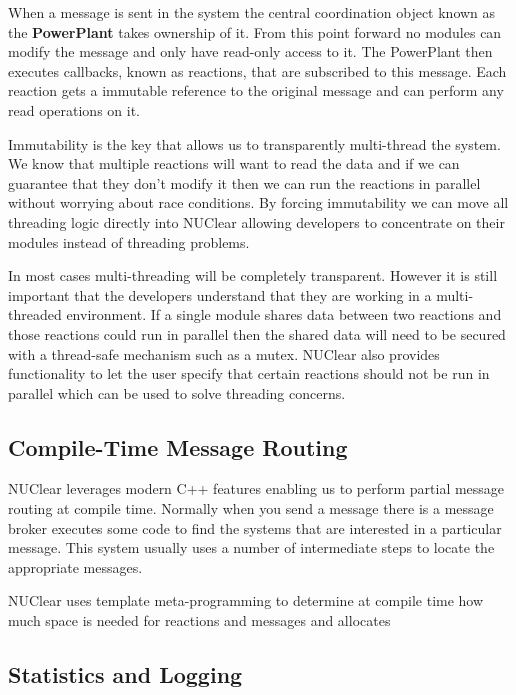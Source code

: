 \documentclass[english,12pt]{scrartcl}
\begin{document}
			When a message is sent in the system the central coordination object known as the \textbf{PowerPlant} takes ownership of it. 
			From this point forward no modules can modify the message and only have read-only access to it.
			The PowerPlant then executes callbacks, known as reactions, that are subscribed to this message.
			Each reaction gets a immutable reference to the original message and can perform any read operations on it.
			
			Immutability is the key that allows us to transparently multi-thread the system.
			We know that multiple reactions will want to read the data and if we can guarantee that they don't modify it then we can
			run the reactions in parallel without worrying about race conditions.
			By forcing immutability we can move all threading logic directly into NUClear allowing developers to concentrate on their modules
			instead of threading problems.
			
			In most cases multi-threading will be completely transparent. 
			However it is still important that the developers understand that they are working in a multi-threaded environment.
			If a single module shares data between two reactions and those reactions could run in parallel then the shared data will
			need to be secured with a thread-safe mechanism such as a mutex.
			NUClear also provides functionality to let the user specify that certain reactions should not be run in parallel which can be used to solve threading concerns.
			
		\subsection{Compile-Time Message Routing}
			NUClear leverages modern C++ features enabling us to perform partial message routing at compile time.
			Normally when you send a message there is a message broker executes some code to find the systems that are interested in a particular message.
			This system usually uses a number of intermediate steps to locate the appropriate messages.
			
			NUClear uses template meta-programming to determine at compile time how much space is needed for reactions and messages and allocates
			
			
		\subsection{Statistics and Logging}
			
\end{document}
